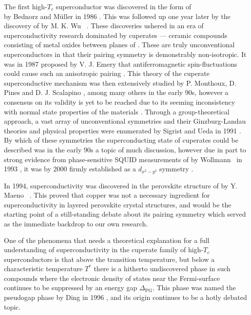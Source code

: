 The first high-$T_c$ superconductor was discovered in the form of\\  by Bednorz and M\"uller in 1986 \cite{Bednorz86}.
This was followed up one
year later by the discovery of  by M. K. Wu \etal\ \cite{Wu87}. These discoveries ushered in an era of superconductivity
research dominated by cuperates --- ceramic compounds consisting of metal oxides between planes of . These are truly unconventional
superconductors in that their pairing symmetry is demonstrably non-isotropic. It was in 1987 proposed by V. J. Emery that antiferromagnetic spin-fluctuations
could cause such an anisotropic pairing \cite{Emery87}. This theory of the cuperate superconductive mechanism was then extensively studied
by P. Monthoux, D. Pines and D. J. Scalapino \cite{Monthoux91, Monthoux92, Monthoux94}, among many others in the early 90s, however
a consensus on its validity is yet to be reached due to its seeming inconsistency with normal state properties of the materials \cite{Keimer15}.
Through a group-theoretical approach, a vast array
of unconventional symmetries and their Ginzburg-Landau theories and physical properties were enumerated by Sigrist and Ueda in 1991 \cite{SigristUeda91}.
By which of these symmetries the superconducting state of cuperates could be described was in the early 90s a topic of much discussion, however
due in part to strong evidence from phase-sensitive SQUID measurements of  by Wollmann \etal\ in 1993 \cite{Wollman93},
it was by 2000 firmly established as a $d_{x^2-y^2}$ symmetry \cite{Tsuei00}.

In 1994, superconductivity was discovered in the perovskite structure of  by Y. Maeno \etal\ \cite{Maeno94}. This proved that copper
was not a necessary ingredient for superconductivity in layered perovskite crystal structures, and would be the starting point of a still-standing
debate about its pairing symmetry which served as the immediate backdrop to our own research.

One of the phenomena that needs a theoretical explanation for a full understanding of superconductivity in the cuperate family of high-$T_c$ superconductors
is that above the transition temperature, but below a characteristic temperature $T^\ast$ there is a hitherto undiscovered phase in such compounds where the electronic density of
states near the Fermi-surface continues to be suppressed by an energy gap $\Delta_\text{PG}$. This phase was named the pseudogap phase by Ding \etal
in 1996 \cite{Ding96}, and its origin continues to be a hotly debated topic.

